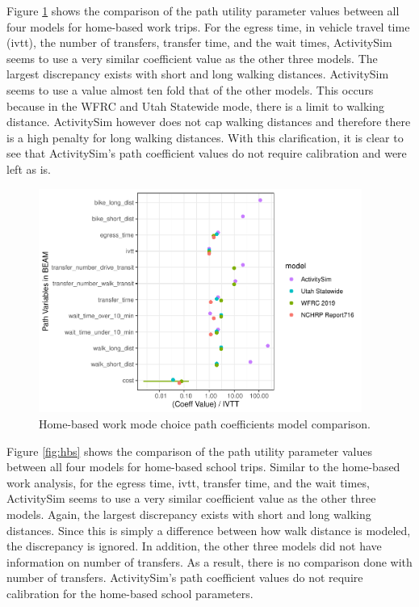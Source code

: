 \documentclass[12pt, oneside, openright]{byuthesis}
\begin{document}
Figure \ref{fig:hbw} shows the comparison of the path utility parameter values between all four models for home-based work trips. For the egress time, in vehicle travel time (ivtt), the number of transfers, transfer time, and the wait times, ActivitySim seems to use a very similar coefficient value as the other three models. The largest discrepancy exists with short and long walking distances. ActivitySim seems to use a value almost ten fold that of the other models. This occurs because in the WFRC and Utah Statewide mode, there is a limit to walking distance. ActivitySim however does not cap walking distances and therefore there is a high penalty for long walking distances. With this clarification, it is clear to see that ActivitySim's path coefficient values do not require calibration and were left as is.

\begin{figure}

{\centering \includegraphics[width=400px]{thesis_files/figure-latex/hbw-1} 

}

\caption{Home-based work mode choice path coefficients model comparison.}\label{fig:hbw}
\end{figure}

Figure \ref{fig:hbs} shows the comparison of the path utility parameter values between all four models for home-based school trips. Similar to the home-based work analysis, for the egress time, ivtt, transfer time, and the wait times, ActivitySim seems to use a very similar coefficient value as the other three models. Again, the largest discrepancy exists with short and long walking distances. Since this is simply a difference between how walk distance is modeled, the discrepancy is ignored. In addition, the other three models did not have information on number of transfers. As a result, there is no comparison done with number of transfers. ActivitySim's path coefficient values do not require calibration for the home-based school parameters.
\end{document}
